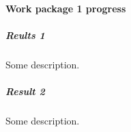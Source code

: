 

\paragraph{Work package 1 progress}

\subparagraph{Reults 1} 

Some description.

\subparagraph{Result 2}

Some description.













